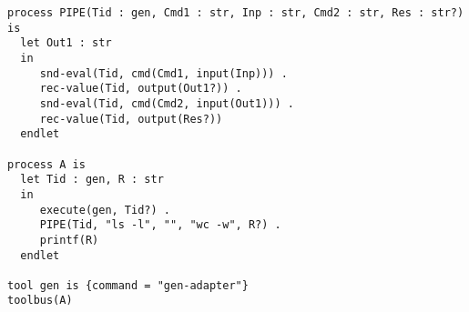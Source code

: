 \small
\begin{verbatim}
process PIPE(Tid : gen, Cmd1 : str, Inp : str, Cmd2 : str, Res : str?) is
  let Out1 : str
  in
     snd-eval(Tid, cmd(Cmd1, input(Inp))) .
     rec-value(Tid, output(Out1?)) .
     snd-eval(Tid, cmd(Cmd2, input(Out1))) .
     rec-value(Tid, output(Res?))
  endlet

process A is
  let Tid : gen, R : str
  in
     execute(gen, Tid?) .
     PIPE(Tid, "ls -l", "", "wc -w", R?) .
     printf(R)
  endlet

tool gen is {command = "gen-adapter"}
toolbus(A)
\end{verbatim}
\normalsize
